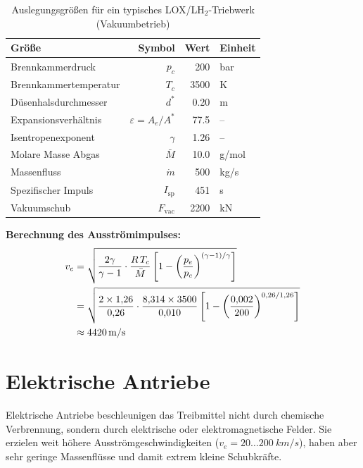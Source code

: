 ﻿\documentclass[12pt,a4paper]{article}
\newcommand{\Isp}{I_{\mathrm{sp}}}
\newcommand{\mdot}{\dot{m}}
\begin{document}
\begin{table}[H]
\centering
\caption{Auslegungsgrößen für ein typisches LOX/LH$_2$-Triebwerk (Vakuumbetrieb)}
\label{tab:triebwerk}
\begin{tabular}{lrrl}
\toprule
\textbf{Größe} & \textbf{Symbol} & \textbf{Wert} & \textbf{Einheit}\\
\midrule
Brennkammerdruck        & $p_c$     & 200        & bar\\
Brennkammertemperatur   & $T_c$     & 3500       & K\\
Düsenhalsdurchmesser    & $d^*$     & 0.20       & m\\
Expansionsverhältnis    & $\varepsilon = A_e/A^*$ & 77.5 & --\\
Isentropenexponent      & $\gamma$  & 1.26       & --\\
Molare Masse Abgas      & $\bar{M}$ & 10.0       & g/mol\\
Massenfluss             & $\mdot$   & 500        & kg/s\\
Spezifischer Impuls     & $\Isp$    & 451        & s\\
Vakuumschub             & $F_{\mathrm{vac}}$ & 2200 & kN\\
\bottomrule
\end{tabular}
\end{table}

\textbf{Berechnung des Ausströmimpulses:}
\begin{align}
  v_e &= \sqrt{\frac{2\gamma}{\gamma-1}\cdot\frac{R\,T_c}{\bar{M}}
    \left[1 - \left(\frac{p_e}{p_c}\right)^{(\gamma-1)/\gamma}\right]} \notag\\
  &= \sqrt{\frac{2\times1{,}26}{0{,}26}\cdot\frac{8{,}314\times3500}{0{,}010}
    \left[1 - \left(\frac{0{,}002}{200}\right)^{0{,}26/1{,}26}\right]} \notag\\
  &\approx \SI{4\,420}{m/s}
\end{align}

\section{Elektrische Antriebe}

Elektrische Antriebe beschleunigen das Treibmittel nicht durch chemische Verbrennung,
sondern durch elektrische oder elektromagnetische Felder. Sie erzielen weit höhere
Ausströmgeschwindigkeiten ($v_e = 20\ldots\SI{200}{km/s}$), haben aber sehr geringe
Massenflüsse und damit extrem kleine Schubkräfte.
\end{document}
